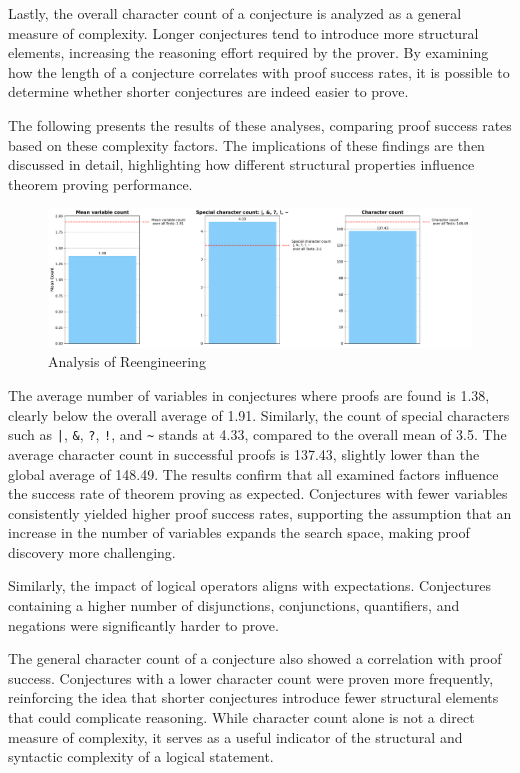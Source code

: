 \documentclass[english,version-2020-11]{uzl-thesis}
\begin{document}
Lastly, the overall character count of a conjecture is analyzed as a general measure of complexity. Longer conjectures tend to introduce more structural elements, increasing the reasoning effort required by the prover. By examining how the length of a conjecture correlates with proof success rates, it is possible to determine whether shorter conjectures are indeed easier to prove.

The following presents the results of these analyses, comparing proof success rates based on these complexity factors. The implications of these findings are then discussed in detail, highlighting how different structural properties influence theorem proving performance.


\begin{figure}[h!]
    \centering
    \includegraphics[width=\textwidth]{combined_graphs.pdf}
    \caption{Analysis of Reengineering}
    \label{fig:analysis_reeingieering}
\end{figure}
\FloatBarrier

The average number of variables in conjectures where proofs are found is 1.38, clearly below the overall average of 1.91. Similarly, the count of special characters such as \texttt{|}, \texttt{\&}, \texttt{?}, \texttt{!}, and \texttt{\textasciitilde} stands at 4.33, compared to the overall mean of 3.5. The average character count in successful proofs is 137.43, slightly lower than the global average of 148.49.
The results confirm that all examined factors influence the success rate of theorem proving as expected. Conjectures with fewer variables consistently yielded higher proof success rates, supporting the assumption that an increase in the number of variables expands the search space, making proof discovery more challenging.

Similarly, the impact of logical operators aligns with expectations. Conjectures containing a higher number of disjunctions, conjunctions, quantifiers, and negations were significantly harder to prove.

The general character count of a conjecture also showed a correlation with proof success. Conjectures with a lower character count were proven more frequently, reinforcing the idea that shorter conjectures introduce fewer structural elements that could complicate reasoning. While character count alone is not a direct measure of complexity, it serves as a useful indicator of the structural and syntactic complexity of a logical statement.
\end{document}
